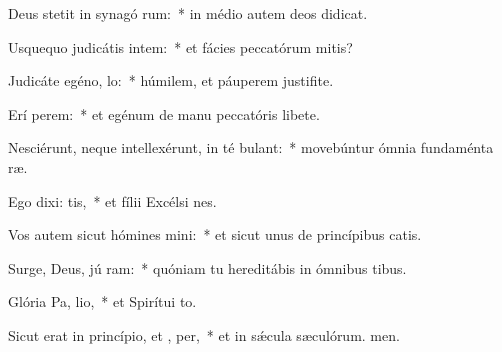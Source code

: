 \item Deus stetit in synagó rum:~* in médio autem deos didicat.
\item Usquequo judicátis intem:~* et fácies peccatórum mitis?
\item Judicáte egéno,  lo:~* húmilem, et páuperem justifite.
\item Erí perem:~* et egénum de manu peccatóris libete.
\item Nesciérunt, neque intellexérunt, in té bulant:~* movebúntur ómnia fundaménta ræ.
\item Ego dixi:  tis,~* et fílii Excélsi nes.
\item Vos autem sicut hómines mini:~* et sicut unus de princípibus catis.
\item Surge, Deus, jú ram:~* quóniam tu hereditábis in ómnibus tibus.
\item Glória Pa,  lio,~* et Spirítui to.
\item Sicut erat in princípio, et ,  per,~* et in sǽcula sæculórum. men.
